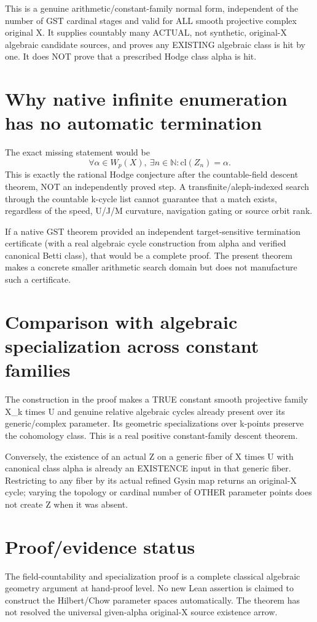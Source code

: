 \documentclass[11pt]{article}
\begin{document}
This is a genuine arithmetic/constant-family
normal form, independent of the number of
GST cardinal stages and valid for ALL
smooth projective complex original X.
It supplies countably many ACTUAL,
not synthetic, original-X algebraic
candidate sources, and proves any
EXISTING algebraic class is hit by one.
It does NOT prove that a prescribed
Hodge class alpha is hit.

\section{Why native infinite enumeration has no automatic termination}
The exact missing statement would be
\[
\forall\alpha\in W_p(X),\
 \exists n\in\mathbb N:
 \mathrm{cl}(Z_n)=\alpha.
\]
This is exactly the rational Hodge
conjecture after the countable-field
descent theorem, NOT an independently
proved step. A transfinite/aleph-indexed
search through the countable k-cycle list
cannot guarantee that a match exists,
regardless of the speed, U/J/M curvature,
navigation gating or source orbit rank.

If a native GST theorem provided an
independent target-sensitive termination
certificate (with a real algebraic cycle
construction from alpha and verified
canonical Betti class), that would be
a complete proof. The present theorem
makes a concrete smaller arithmetic
search domain but does not manufacture
such a certificate.

\section{Comparison with algebraic specialization across constant families}
The construction in the proof makes a
TRUE constant smooth projective family
X_k times U and genuine relative
algebraic cycles already present
over its generic/complex parameter.
Its geometric specializations
over k-points preserve the cohomology
class. This is a real positive
constant-family descent theorem.

Conversely, the existence of an actual
Z on a generic fiber of X times U with
canonical class alpha is already
an EXISTENCE input in that generic fiber.
Restricting to any fiber by its actual
refined Gysin map returns an original-X
cycle; varying the topology or cardinal
number of OTHER parameter points
does not create Z when it was absent.

\section{Proof/evidence status}
The field-countability and specialization
proof is a complete classical algebraic
geometry argument at hand-proof level.
No new Lean assertion is claimed to
construct the Hilbert/Chow parameter
spaces automatically. The theorem has
not resolved the universal given-alpha
original-X source existence arrow.
\end{document}
